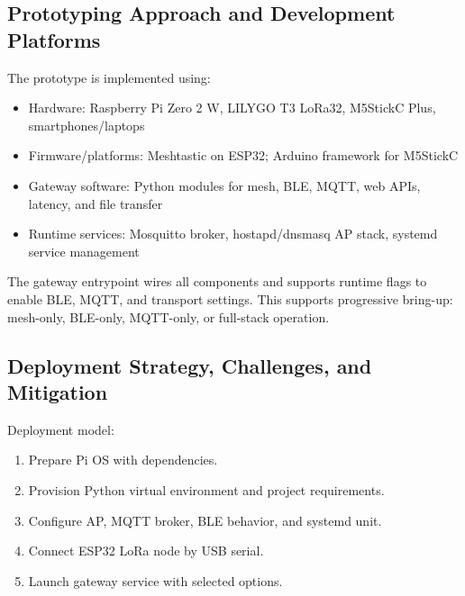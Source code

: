 \documentclass[conference]{IEEEtran}
\begin{document}
\subsection{Prototyping Approach and Development Platforms}
The prototype is implemented using:
\begin{itemize}
\item Hardware: Raspberry Pi Zero 2 W, LILYGO T3 LoRa32, M5StickC Plus, smartphones/laptops
\item Firmware/platforms: Meshtastic on ESP32; Arduino framework for M5StickC
\item Gateway software: Python modules for mesh, BLE, MQTT, web APIs, latency, and file transfer
\item Runtime services: Mosquitto broker, hostapd/dnsmasq AP stack, systemd service management
\end{itemize}

The gateway entrypoint wires all components and supports runtime flags to enable BLE, MQTT, and transport settings. This supports progressive bring-up: mesh-only, BLE-only, MQTT-only, or full-stack operation.

\subsection{Deployment Strategy, Challenges, and Mitigation}
Deployment model:
\begin{enumerate}
\item Prepare Pi OS with dependencies.
\item Provision Python virtual environment and project requirements.
\item Configure AP, MQTT broker, BLE behavior, and systemd unit.
\item Connect ESP32 LoRa node by USB serial.
\item Launch gateway service with selected options.
\end{enumerate}
\end{document}
